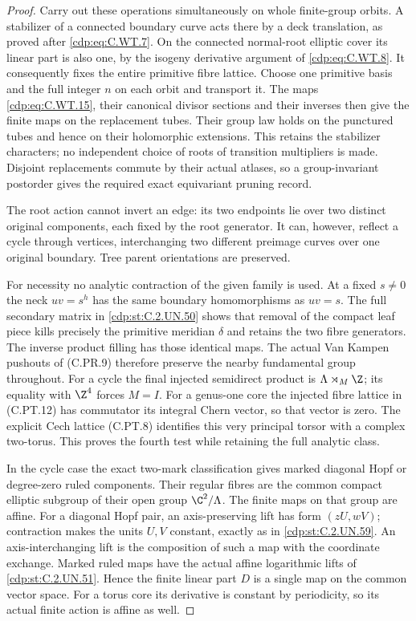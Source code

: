 \begin{proof}
Carry out these operations simultaneously
on whole finite-group orbits. A stabilizer
of a connected boundary curve acts there
by a deck translation, as proved after
\eqref{cdp:eq:C.WT.7}. On the connected normal-root
elliptic cover its linear part is also
one, by the isogeny derivative argument
of \eqref{cdp:eq:C.WT.8}. It consequently fixes the
entire primitive fibre lattice. Choose
one primitive basis and the full integer
\(n\) on each orbit and transport it.
The maps \eqref{cdp:eq:C.WT.15}, their canonical
divisor sections and their inverses
then give the finite maps on the
replacement tubes. Their group law
holds on the punctured tubes and hence
on their holomorphic extensions.
This retains the stabilizer characters;
no independent choice of roots of
transition multipliers is made.
Disjoint replacements commute by their
actual atlases, so a group-invariant
postorder gives the required exact
equivariant pruning record.

The root action cannot invert an edge:
its two endpoints lie over two distinct
original components, each fixed by the
root generator. It can, however, reflect
a cycle through vertices, interchanging
two different preimage curves over one
original boundary. Tree parent
orientations are preserved.

For necessity no analytic contraction
of the given family is used.
At a fixed \(s\ne0\) the neck
\(uv=s^h\) has the same boundary
homomorphisms as \(uv=s\).
The full secondary matrix in \ref{cdp:st:C.2.UN.50}
shows that removal of the compact
leaf piece kills precisely the
primitive meridian \(\delta\) and
retains the two fibre generators.
The inverse product filling has
those identical maps. The actual
Van Kampen pushouts of (C.PR.9)
therefore preserve the nearby
fundamental group throughout.
For a cycle the final injected
semidirect product is
\(\Lambda\rtimes_M\Z\); its equality
with \(\Z^4\) forces \(M=I\).
For a genus-one core the injected
fibre lattice in (C.PT.12) has
commutator its integral Chern
vector, so that vector is zero.
The explicit Cech lattice
(C.PT.8) identifies this very
principal torsor with a complex
two-torus. This proves the fourth
test while retaining the full
analytic class.

In the cycle case the exact two-mark
classification gives marked diagonal
Hopf or degree-zero ruled components.
Their regular fibres are the common
compact elliptic subgroup of their
open group \(\C^2/\Lambda\).
The finite maps on that group are
affine. For a diagonal Hopf pair,
an axis-preserving lift has form
\((zU,wV)\); contraction makes
the units \(U,V\) constant, exactly
as in \ref{cdp:st:C.2.UN.59}. An axis-interchanging
lift is the composition of such
a map with the coordinate
exchange. Marked ruled maps have
the actual affine logarithmic
lifts of \ref{cdp:st:C.2.UN.51}. Hence the finite
linear part \(D\) is a single
map on the common vector space.
For a torus core its derivative
is constant by periodicity,
so its actual finite action is
affine as well.


\end{proof}
